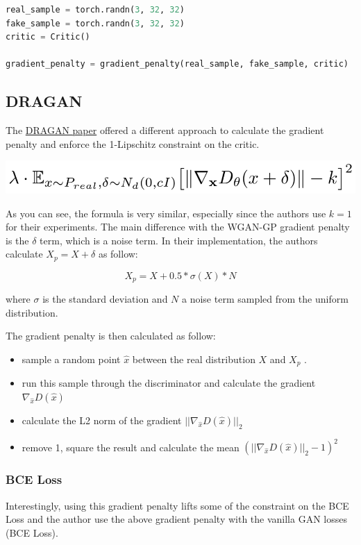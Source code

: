 \begin{lstlisting}[language=Python]
real_sample = torch.randn(3, 32, 32)
fake_sample = torch.randn(3, 32, 32)
critic = Critic()

gradient_penalty = gradient_penalty(real_sample, fake_sample, critic)
\end{lstlisting}

\subsection{DRAGAN}

The \href{https://arxiv.org/pdf/1705.07215.pdf}{DRAGAN paper} offered a
different approach to calculate the gradient penalty and enforce the
1-Lipschitz constraint on the critic.

\includegraphics[width=1\linewidth]{img//genAdvNet//modernGAN/dragan_gp.png}
    
As you can see, the formula is very similar, especially since the
authors use \(k = 1\) for their experiments. The main difference with
the WGAN-GP gradient penalty is the \(\delta\) term, which is a noise
term. In their implementation, the authors calculate \(X_p = X + \delta\) as follow:

\[X_{p} = X + 0.5 * \sigma({X}) * N\]

where \(\sigma\) is the standard deviation and \(N\) a noise term
sampled from the uniform distribution. \newline

The gradient penalty is then calculated as follow: 
\begin{itemize}
    \item sample a random point \(\hat{x}\) between the real distribution \(X\) and \(X_{p}\) .
    \item run this sample through the discriminator and calculate the gradient \(\nabla_{\hat{x}} D(\hat{x})\)
    \item calculate the L2 norm of the gradient \(|| \nabla_{\hat{x}} D(\hat{x}) ||_{2}\)
    \item remove 1, square the result and calculate the mean \((|| \nabla_{\hat{x}} D(\hat{x}) ||_{2} - 1) ^{2}\)
\end{itemize}

\subsubsection{BCE Loss}
Interestingly, using this gradient penalty lifts some of the constraint
on the BCE Loss and the author use the above gradient penalty with the
vanilla GAN losses (BCE Loss).

